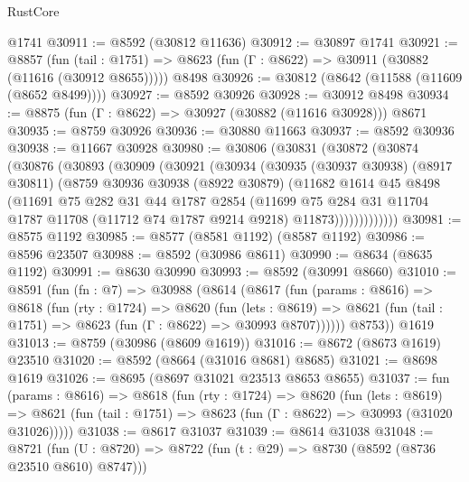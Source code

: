 \begin{lexlean}{RustCore}
\begin{coremodule}
    @1741
@30911 := @8592 (@30812 @11636)
@30912 := @30897 @1741
@30921 := @8857
    (fun (tail : @1751) => @8623 (fun (Γ : @8622) => @30911 (@30882 (@11616 (@30912 @8655)))))
    @8498
@30926 := @30812 (@8642 (@11588 (@11609 (@8652 @8499))))
@30927 := @8592 @30926
@30928 := @30912 @8498
@30934 := @8875 (fun (Γ : @8622) => @30927 (@30882 (@11616 @30928))) @8671
@30935 := @8759 @30926
@30936 := @30880 @11663
@30937 := @8592 @30936
@30938 := @11667 @30928
@30980 := @30806
    (@30831
      (@30872
        (@30874
          (@30876
            (@30893
              (@30909
                (@30921
                  (@30934
                    (@30935
                      (@30937 @30938)
                      (@8917 @30811)
                      (@8759
                        @30936
                        @30938
                        (@8922 @30879)
                        (@11682
                          @1614
                          @45
                          @8498
                          (@11691
                            @75
                            @282
                            @31
                            @44
                            @1787
                            @2854
                            (@11699
                              @75
                              @284
                              @31
                              @11704
                              @1787
                              @11708
                              (@11712 @74 @1787 @9214 @9218)
                              @11873)))))))))))))
@30981 := @8575 @1192
@30985 := @8577 (@8581 @1192) (@8587 @1192)
@30986 := @8596 @23507
@30988 := @8592 (@30986 @8611)
@30990 := @8634 (@8635 @1192)
@30991 := @8630 @30990
@30993 := @8592 (@30991 @8660)
@31010 := @8591
    (fun (fn : @7) =>
    @30988
      (@8614
        (@8617
          (fun (params : @8616) =>
          @8618
            (fun (rty : @1724) =>
            @8620
              (fun (lets : @8619) =>
              @8621 (fun (tail : @1751) => @8623 (fun (Γ : @8622) => @30993 @8707))))))
        @8753))
    @1619
@31013 := @8759 (@30986 (@8609 @1619))
@31016 := @8672 (@8673 @1619) @23510
@31020 := @8592 (@8664 (@31016 @8681) @8685)
@31021 := @8698 @1619
@31026 := @8695 (@8697 @31021 @23513 @8653 @8655)
@31037 := fun (params : @8616) =>
  @8618
    (fun (rty : @1724) =>
    @8620
      (fun (lets : @8619) =>
      @8621 (fun (tail : @1751) => @8623 (fun (Γ : @8622) => @30993 (@31020 @31026)))))
@31038 := @8617 @31037
@31039 := @8614 @31038
@31048 := @8721
    (fun (U : @8720) => @8722 (fun (t : @29) => @8730 (@8592 (@8736 @23510 @8610) @8747)))

\end{coremodule}
\end{lexlean}
